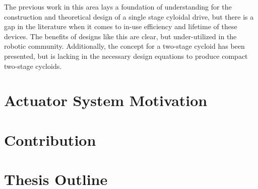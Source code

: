 The previous work in this area lays a foundation of understanding for the construction and theoretical design of a single stage cyloidal drive, but there is a gap in the literature when it comes to in-use efficiency and lifetime of these devices. The benefits of designs like this are clear, but under-utilized in the robotic community. Additionally, the concept for a two-stage cycloid has been presented, but is lacking in the necessary design equations to produce compact two-stage cycloids. 

\section{Actuator System Motivation} \label{intro:projects}

\section{Contribution} \label{intro:contribution}

\section{Thesis Outline} 

